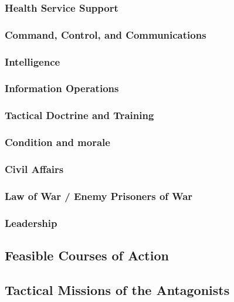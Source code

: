 \subsubsection{Health Service Support}
\subsubsection{Command, Control, and Communications}
\subsubsection{Intelligence}
\subsubsection{Information Operations}
\subsubsection{Tactical Doctrine and Training}
\subsubsection{Condition and morale}
\subsubsection{Civil Affairs}
\subsubsection{Law of War / Enemy Prisoners of War}
\subsubsection{Leadership}
\subsection{Feasible Courses of Action}
\subsection{Tactical Missions of the Antagonists}

